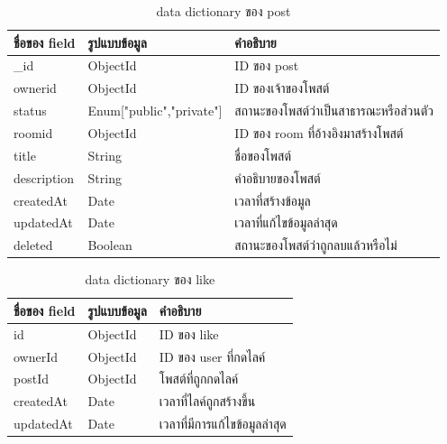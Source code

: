\documentclass[12pt,oneside,openright,a4paper]{cpe-thai-project}
\begin{document}
\begin{table}
  \caption{data dictionary ของ post }\label{tbl:er-table3}
  \begin{tabular}{|p{2.5cm}|p{4cm}|p{8cm}|}
    \hline
    \textbf{ชื่อของ field} & \textbf{รูปแบบข้อมูล}       & \textbf{คำอธิบาย}                  \\
    \hline
    \_id                 & ObjectId                 & ID ของ post                      \\
    \hline
    ownerid              & ObjectId                 & ID ของเจ้าของโพสต์                 \\
    \hline
    status               & Enum["public","private"] & สถานะของโพสต์ว่าเป็นสาธารณะหรือส่วนตัว \\
    \hline
    roomid               & ObjectId                 & ID ของ room ที่อ้างอิงมาสร้างโพสต์     \\
    \hline
    title                & String                   & ชื่อของโพสต์                        \\
    \hline
    description          & String                   & คำอธิบายของโพสต์                    \\
    \hline
    createdAt            & Date                     & เวลาที่สร้างข้อมูล                    \\
    \hline
    updatedAt            & Date                     & เวลาที่แก้ไขข้อมูลล่าสุด                \\
    \hline
    deleted              & Boolean                  & สถานะของโพสต์ว่าถูกลบแล้วหรือไม่       \\
    \hline
  \end{tabular}
\end{table}
\begin{table}
  \caption{data dictionary ของ like }\label{tbl:er-table4}
  \begin{tabular}{|p{2.5cm}|p{5cm}|p{4cm}|}
    \hline
    \textbf{ชื่อของ field} & \textbf{รูปแบบข้อมูล} & \textbf{คำอธิบาย}       \\
    \hline
    id                   & ObjectId           & ID ของ like           \\
    \hline
    ownerId              & ObjectId           & ID ของ user ที่กดไลค์    \\
    \hline
    postId               & ObjectId           & โพสต์ที่ถูกกดไลค์          \\
    \hline
    createdAt            & Date               & เวลาที่ไลค์ถูกสร้างขึ้น      \\
    \hline
    updatedAt            & Date               & เวลาที่มีการแก้ไขข้อมูลล่าสุด \\
    \hline
  \end{tabular}
\end{table}
\end{document}
